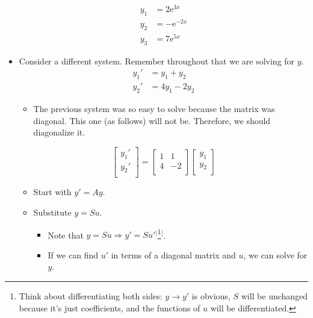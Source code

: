 \documentclass{article}
\newcommand{\e}{\text{e}}
\begin{document}
\begin{itemize}
\begin{itemize}
    \end{itemize}
    \begin{align*}
        y_1 &= 2\e^{3x}\\
        y_2 &= -\e^{-2x}\\
        y_3 &= 7\e^{5x}
    \end{align*}
    \item Consider a different system. Remember throughout that we are solving for $y$.
    \begin{align*}
        y_1' &= y_1+y_2\\
        y_2' &= 4y_1-2y_2
    \end{align*}
    \begin{itemize}
        \item The previous system was so easy to solve because the matrix was diagonal. This one (as follows) will not be. Therefore, we should diagonalize it.
    \end{itemize}
    \begin{equation*}
        \begin{bmatrix}
            y_1'\\
            y_2'\\
        \end{bmatrix}
        =
        \begin{bmatrix}
            1 & 1\\
            4 & -2\\
        \end{bmatrix}
        \begin{bmatrix}
            y_1\\
            y_2\\
        \end{bmatrix}
    \end{equation*}
    \begin{itemize}
        \item Start with $y'=Ay$.
        \item Substitute $y=Su$.
        \begin{itemize}
            \item Note that $y=Su\Rightarrow y'=Su'$$^[$\footnote{Think about differentiating both sides: $y\rightarrow y'$ is obvious, $S$ will be unchanged because it's just coefficients, and the functions of $u$ will be differentiated.}$^]$.
            \item If we can find $u'$ in terms of a diagonal matrix and $u$, we can solve for $y$.
        \end{itemize}

\end{itemize}
\end{itemize}
\end{document}
